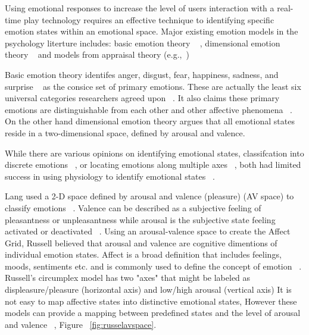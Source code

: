 
Using emotional responses to increase the level of users interaction with a real-time 
play technology requires an effective technique to identifying specific emotion 
states within an emotional space. Major existing emotion models in the
psychology literture includes: basic emotion theory ~\cite{ekman1992argument, ekman1992there} ,
dimensional emotion theory ~\cite{lang1995emotion, russell1980circumplex} and models from appraisal 
theory (e.g.,~\cite{roseman2001model}) ~\cite{zhang2010service}

Basic emotion theory identifes anger, disgust, fear, happiness, sadness, and 
surprise ~\cite{peter2006emotion} as the consice set of primary
emotions. These are actually the least six universal categories researchers agreed 
upon ~\cite{zagalo2004story}. It also claims these
primary emotions are distinguishable from each other and
other affective phenomena ~\cite{dalgleish1999handbook}. On the other hand dimensional 
emotion theory argues that all emotional states reside
in a two-dimensional space, defined by arousal and valence.

While there are various opinions on identifying emotional
states, classifcation into discrete emotions ~\cite{dalgleish1999handbook}, or locating
emotions along multiple axes ~\cite{russell1989affect, lang1995emotion}, both 
had limited success in using physiology to identify 
emotional states ~\cite{cacioppo2000psychophysiology}.

Lang used a 2-D space defined by arousal and valence (pleasure) (AV space) 
to classify emotions ~\cite{lang1995emotion}. Valence can be
described as a subjective feeling of pleasantness or unpleasantness while 
arousal is the subjective state feeling activated
or deactivated ~\cite{barrett1998discrete}. Using an arousal-valence space to create
the Affect Grid, Russell believed that arousal and valence
are cognitive dimentions of individual emotion states. Affect is a broad definition 
that includes feelings, moods, sentiments etc. and is commonly used to define the concept of
emotion ~\cite{picard2003affective}. Russell's circumplex model has two "axes"
that might be labeled as displeasure/pleasure (horizontal
axis) and low/high arousal (vertical axis) It is not easy to
map affective states into distinctive emotional states, However these models can 
provide a mapping between predefined
states and the level of arousal and valence ~\cite{zagalo2004story}, Figure ~\ref{fig:russelavspace}.

